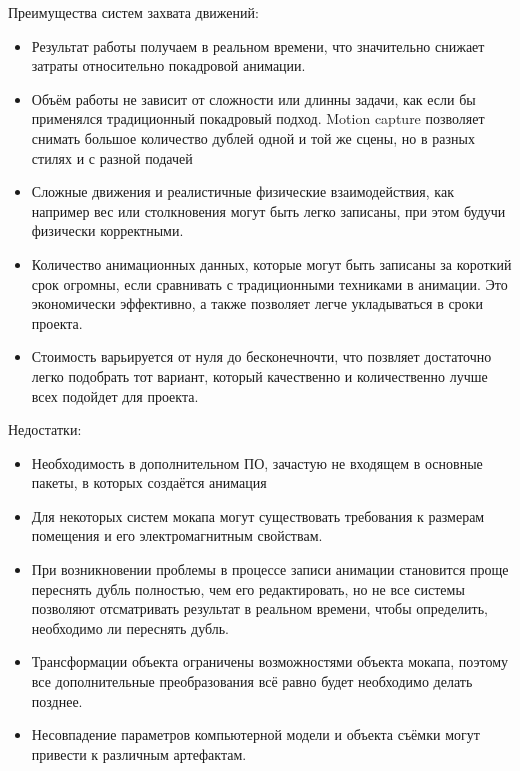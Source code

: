 Преимущества систем захвата движений:
\begin{itemize}
	\item Результат работы получаем в реальном времени, что значительно снижает затраты относительно покадровой анимации.
	\item Объём работы не зависит от сложности или длинны задачи, как если бы применялся традиционный покадровый подход. Motion capture позволяет снимать большое количество дублей одной и той же сцены, но в разных стилях и с разной подачей
	\item Сложные движения и реалистичные физические взаимодействия, как например вес или столкновения могут быть легко записаны, при этом будучи физически корректными.
	\item Количество анимационных данных, которые могут быть записаны за короткий срок огромны, если сравнивать с традиционными техниками в анимации. Это экономически эффективно, а также позволяет легче укладываться в сроки проекта.
	\item Стоимость варьируется от нуля до бесконечночти, что позвляет достаточно легко подобрать тот вариант, который качественно и количественно лучше всех подойдет для проекта.
\end{itemize}

Недостатки:
\begin{itemize}
	\item Необходимость в дополнительном ПО, зачастую не входящем в основные пакеты, в которых создаётся анимация
	\item Для некоторых систем мокапа могут существовать требования к размерам помещения и его электромагнитным свойствам.
	\item При возникновении проблемы в процессе записи анимации становится проще переснять дубль полностью, чем его редактировать, но не все системы позволяют отсматривать результат в реальном времени, чтобы определить, необходимо ли переснять дубль.
	\item Трансформации объекта ограничены возможностями объекта мокапа, поэтому все дополнительные преобразования всё равно будет необходимо делать позднее.
	\item Несовпадение параметров компьютерной модели и объекта съёмки могут привести к различным артефактам.
\end{itemize}
\clearpage
